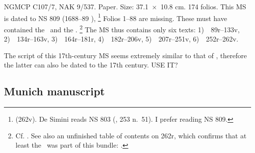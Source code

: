 NGMCP C107/7, NAK 9/537. Paper. Size: 
37.1~×~10.8 cm. 174 folios. This MS is
dated to NS 809 (1688--89 \CE),%
		\footnote{ (\fol262v). 
		De Simini reads NS 803
		(\citeyear{DeSiminiMSSFromNepal2016}, 253 n.~51).
		I prefer reading NS 809. }
Folios 1--88 are missing. These must have contained the \SDhS\ and the \SDhU.%
			\footnote{Cf. 
				. 
				See also an unfinished table of contents on \fol262r,
				which confirms that at least the \SDhS\ was part 
				of this bundle: .}
The MS thus contains only six texts:
1)~\SDhSangr\ \fols89r--133v,
2)~\Ums\ \fols134r--163v,
3)~\SivaUp\ \fols164r--181r,
4)~\Uums\ \fols182r--206v,
5)~\Vss\ \fols207r--251v, %
6)~\DharmP\ \fols252r--262v. 

The script of this 17th-century MS seems 
extremely similar to that of \msPaperA, 
therefore the latter can also be
dated to the 17th century. USE IT? \CHECK



\medskip
\subsection{Munich manuscript}

